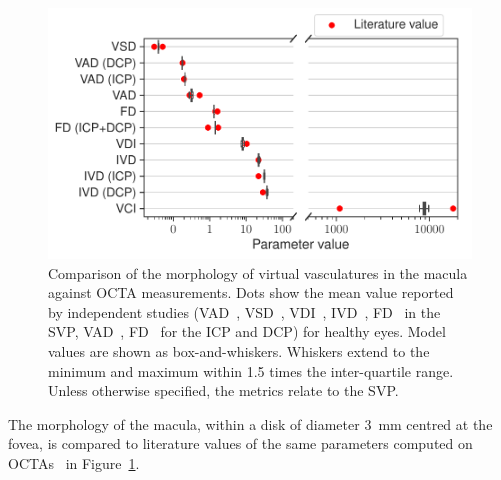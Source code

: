 \documentclass[11pt,]{article}
\begin{document}
\begin{figure}[ht!]
  \centering
  \includegraphics[width=.75\textwidth]{Baseline_metrics}
  \caption{\label{fig:OCTAValidation}Comparison of the morphology of virtual vasculatures in the macula against OCTA measurements. Dots show the mean value reported by independent studies (VAD~\cite{Mehta_2019}, VSD~\cite{Mehta_2019}, VDI~\cite{Mehta_2020}, IVD~\cite{Liu_2021}, FD~\cite{Agarwal_2019,Ma2021} in the SVP, VAD~\cite{Chan2012}, FD~\cite{Agarwal_2019,Ma2021} for the ICP and DCP) for healthy eyes. Model values are shown as box-and-whiskers. Whiskers extend to the minimum and maximum within \SI{1.5}{} times the inter-quartile range. Unless otherwise specified, the metrics relate to the SVP.}  
\end{figure}

The morphology of the macula, within a disk of diameter \SI{3}{\mm} centred at the fovea, is compared to literature values of the same parameters computed on OCTAs~\cite{Chu2016,Liu_2021,Ma2021} in Figure~\ref{fig:OCTAValidation}.
\end{document}
